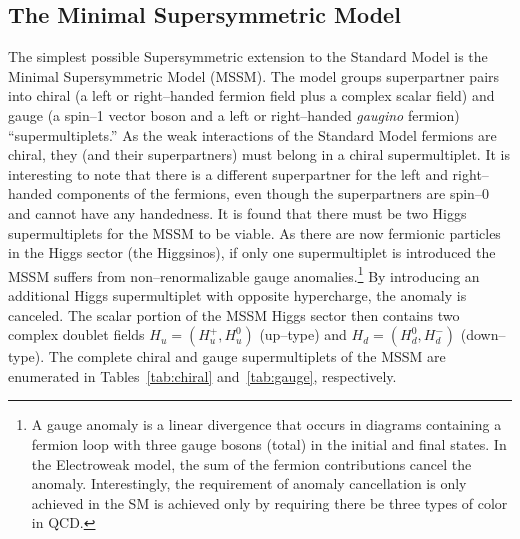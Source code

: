 \subsection{The Minimal Supersymmetric Model}
\label{sec:MSSMAndTaus} The simplest possible Supersymmetric extension to the
Standard Model is the Minimal Supersymmetric Model (MSSM).  The model groups
superpartner pairs into chiral (a left or right--handed fermion field plus a
complex scalar field) and gauge (a spin--1 vector boson and a left or
right--handed \emph{gaugino} fermion) ``supermultiplets.''  As the weak
interactions of the Standard Model fermions are chiral, they (and their
superpartners) must belong in a chiral supermultiplet.  It is interesting to
note that there is a different superpartner for the left and right--handed
components of the fermions, even though the superpartners are spin--0 and cannot
have any handedness. It is found that there must be two Higgs supermultiplets
for the MSSM to be viable.  As there are now fermionic particles in the Higgs
sector (the Higgsinos), if only one supermultiplet is introduced the MSSM suffers
from non--renormalizable gauge anomalies.\footnote{A gauge anomaly is a linear
divergence that occurs in diagrams containing a fermion loop with three gauge
bosons (total) in the initial and final states.  In the Electroweak model, the
sum of the fermion contributions cancel the anomaly.  Interestingly, the
requirement of anomaly cancellation is only achieved in the SM is achieved only
by requiring there be three types of color in QCD.}  By introducing an
additional Higgs supermultiplet with opposite hypercharge, the anomaly is
canceled. The scalar portion of the MSSM Higgs sector then contains two complex
doublet fields $H_u = (H^+_u, H^0_u)$ (up--type) and $H_d = (H^0_d, H^-_d)$
(down--type).  The complete chiral and gauge supermultiplets of the MSSM are
enumerated in Tables~\ref{tab:chiral} and~\ref{tab:gauge}, respectively.
\renewcommand{\arraystretch}{1.4}

